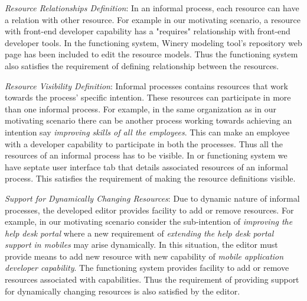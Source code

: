 \textit{Resource Relationships Definition}: In an informal process, each resource can have a relation with other resource. For example in our motivating scenario, a resource with front-end developer capability has a "requires" relationship with front-end developer tools. In the functioning system, Winery modeling tool's repository web page has been included to edit the resource models. Thus the functioning system also satisfies the requirement of defining relationship between the resources. 

\textit{Resource Visibility Definition}: Informal processes contains resources that work towards the process' specific intention. These resources can participate in more than one informal process. For example, in the same organization as in our motivating scenario there can be another process working towards achieving an intention say \textit{improving skills of all the employees}. This can make an employee with a developer capability to participate in both the processes. Thus all the resources of an informal process has to be visible. In or functioning system we have septate user interface tab that details associated resources of an informal process. This satisfies the requirement of making the resource definitions visible.    

\textit{Support for Dynamically Changing Resources}: Due to dynamic nature of informal processes, the developed editor provides facility to add or remove resources. For example, in our motivating scenario consider the sub-intention of \textit{improving the help desk portal} where a new requirement of \textit{extending the help desk portal support in mobiles} may arise dynamically. In this situation, the editor must provide means to add new resource with new capability of \textit{mobile application developer capability}. The functioning system provides facility to add or remove resources associated with capabilities. Thus the requirement of providing support for dynamically changing resources is also satisfied by the editor. 
	


